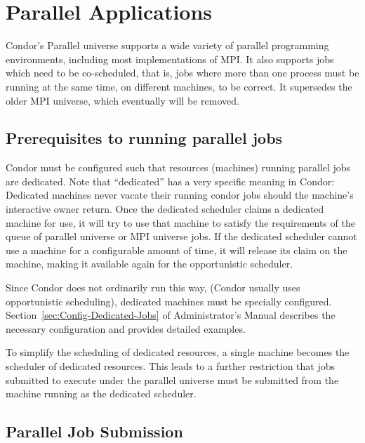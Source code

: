 \section{\label{sec:Parallel}Parallel Applications}

Condor's Parallel universe supports a wide variety of parallel
programming environments, including most implementations of MPI.  It
also supports jobs which need to be co-scheduled, that is, jobs where
more than one process must be running at the same time, on different
machines, to be correct.  It supersedes the older MPI universe, which
eventually will be removed.


\subsection{\label{sec:parallel-setup}Prerequisites to running parallel jobs}

Condor must be configured such that resources (machines) running
parallel jobs are dedicated.   Note that
``dedicated'' has a very specific meaning in Condor: Dedicated
machines never vacate their running condor jobs should the machine's
interactive owner return.  Once the dedicated scheduler claims a
dedicated machine for use, it will try to use that machine to satisfy
the requirements of the queue of parallel universe or MPI universe
jobs.  If the dedicated scheduler cannot use a machine for a
configurable amount of time, it will release its claim on the machine,
making it available again for the opportunistic scheduler.

Since Condor does not ordinarily run this way, (Condor usually uses
opportunistic scheduling), dedicated machines must be specially
configured.  Section~\ref{sec:Config-Dedicated-Jobs} of
Administrator's Manual describes the necessary configuration and
provides detailed examples.

To simplify the scheduling of dedicated resources, a single machine
becomes the scheduler of dedicated resources.  This leads to a further
restriction that jobs submitted to execute under the parallel universe
must be submitted from the machine running as the dedicated scheduler.

\subsection{\label{sec:parallel-submit}Parallel Job Submission}

